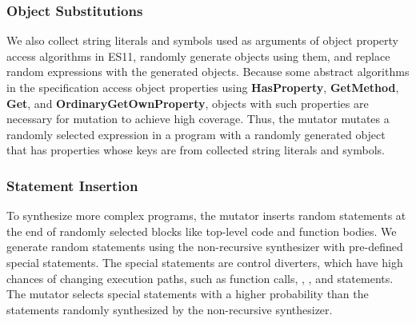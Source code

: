 \subsubsection{Object Substitutions}
We also collect string literals and symbols used as arguments of object
property access algorithms in ES11, randomly generate objects using them,
and replace random expressions with the generated objects.
Because some abstract algorithms in the specification access object properties
using \textbf{HasProperty}, \textbf{GetMethod}, \textbf{Get}, and
\textbf{OrdinaryGetOwnProperty}, 
objects with such properties are necessary for mutation to achieve high coverage.  
Thus, the mutator mutates a randomly selected expression in a program with a
randomly generated object that has properties whose keys are from
collected string literals and symbols.


\subsubsection{Statement Insertion}
To synthesize more complex programs, the mutator inserts random
statements at the end of randomly selected blocks like
top-level code and function bodies.  We generate random
statements using the non-recursive synthesizer with pre-defined
special statements.  The special statements are control diverters, which
have high chances of changing execution paths, such as function calls,
, , and  statements.  The mutator
selects special statements with a higher probability than the statements
randomly synthesized by the non-recursive synthesizer.

